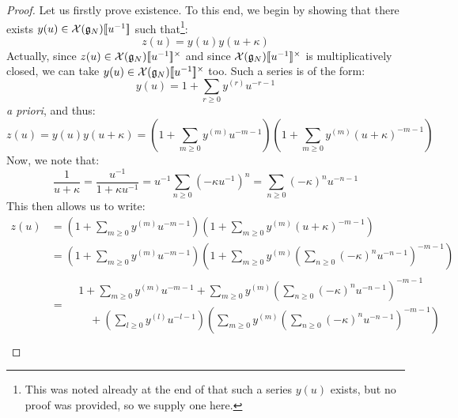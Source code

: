                 \begin{proof}
                    Let us firstly prove existence. To this end, we begin by showing that there exists $y(u) \in \calX(\g_N)[\![u^{-1}]\!]$ such that\footnote{This was noted already at the end of \cite[Section 2]{guay_regelskis_twisted_yangians_for_symmetric_pairs_of_types_BCD} that such a series $y(u)$ exists, but no proof was provided, so we supply one here.}:
                        $$z(u) = y(u) y(u + \kappa)$$
                    Actually, since $z(u) \in \calX(\g_N)[\![u^{-1}]\!]^{\x}$ and since $\calX(\g_N)[\![u^{-1}]\!]^{\x}$ is multiplicatively closed, we can take $y(u) \in \calX(\g_N)[\![u^{-1}]\!]^{\x}$ too. Such a series is of the form:
                        $$y(u) = 1 + \sum_{r \geq 0} y^{(r)} u^{-r - 1}$$
                    \textit{a priori}, and thus:
                        $$z(u) = y(u) y(u + \kappa) = \left( 1 + \sum_{m \geq 0} y^{(m)} u^{-m - 1} \right) \left( 1 + \sum_{m \geq 0} y^{(m)} (u + \kappa)^{-m - 1} \right)$$
                    Now, we note that:
                        $$\frac{1}{u + \kappa} = \frac{u^{-1}}{1 + \kappa u^{-1}} = u^{-1} \sum_{n \geq 0} (-\kappa u^{-1})^n = \sum_{n \geq 0} (-\kappa)^n u^{-n - 1}$$
                    This then allows us to write:
                        $$
                            \begin{aligned}
                                z(u) & = \left( 1 + \sum_{m \geq 0} y^{(m)} u^{-m - 1} \right) \left( 1 + \sum_{m \geq 0} y^{(m)} (u + \kappa)^{-m - 1} \right)
                                \\
                                & = \left( 1 + \sum_{m \geq 0} y^{(m)} u^{-m - 1} \right) \left( 1 + \sum_{m \geq 0} y^{(m)} \left( \sum_{n \geq 0} (-\kappa)^n u^{-n - 1} \right)^{-m - 1} \right)
                                \\
                                & =
                                \begin{aligned}
                                    & 1 + \sum_{m \geq 0} y^{(m)} u^{-m - 1} + \sum_{m \geq 0} y^{(m)} \left( \sum_{n \geq 0} (-\kappa)^n u^{-n - 1} \right)^{-m - 1}
                                    \\
                                    & \quad + \left( \sum_{l \geq 0} y^{(l)} u^{-l - 1} \right)\left( \sum_{m \geq 0} y^{(m)} \left( \sum_{n \geq 0} (-\kappa)^n u^{-n - 1} \right)^{-m - 1} \right)
                                \end{aligned}
                                \\

\end{aligned}$$
\end{proof}
